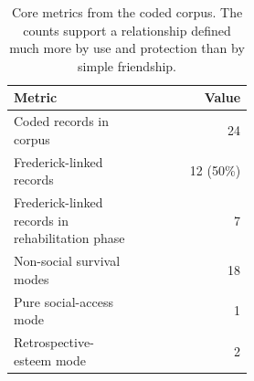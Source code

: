 \begin{table}[t]
\centering
\small
\begin{tabular}{p{0.52\linewidth}r}
\toprule
Metric & Value \\
\midrule
Coded records in corpus & 24 \\
Frederick-linked records & 12 (50\%) \\
Frederick-linked records in rehabilitation phase & 7 \\
Non-social survival modes & 18 \\
Pure social-access mode & 1 \\
Retrospective-esteem mode & 2 \\
\bottomrule
\end{tabular}
\caption{Core metrics from the coded corpus. The counts support a relationship defined much more by use and protection than by simple friendship.}
\label{tab:keyfindings}
\end{table}
